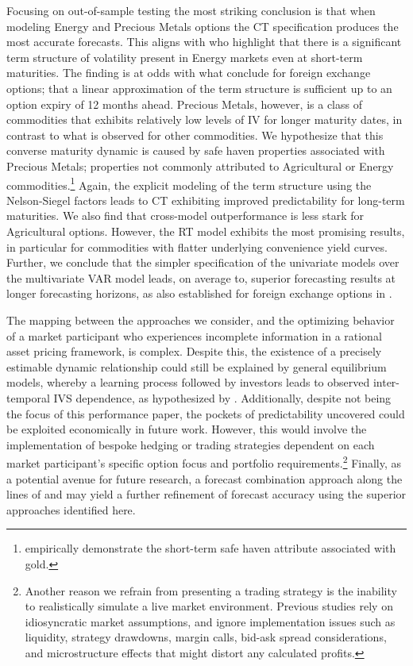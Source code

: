 \documentclass[12pt,a4paper]{article}
\begin{document}
Focusing on out-of-sample testing the most striking conclusion is that when modeling Energy and Precious Metals options the CT specification produces the most accurate forecasts. This aligns with \cite{doran2008computing} who highlight that there is a significant term structure of volatility present in Energy markets even at short-term maturities. The finding is at odds with what \cite{chalamandaris2011important} conclude for foreign exchange options; that a linear approximation of the term structure is sufficient up to an option expiry of 12 months ahead. Precious Metals, however, is a class of commodities that exhibits relatively low levels of IV for longer maturity dates, in contrast to what is observed for other commodities. We hypothesize that this converse maturity dynamic is caused by safe haven properties associated with Precious Metals; properties not commonly attributed to Agricultural or Energy commodities.\footnote{\cite{baur2010gold} empirically demonstrate the short-term safe haven attribute associated with gold.} Again, the explicit modeling of the term structure using the Nelson-Siegel factors leads to CT exhibiting improved predictability for long-term maturities. We also find that cross-model outperformance is less stark for Agricultural options. However, the RT model exhibits the most promising results, in particular for commodities with flatter underlying convenience yield curves. Further, we conclude that the simpler specification of the univariate models over the multivariate VAR model leads, on average to, superior forecasting results at longer forecasting horizons, as also established for foreign exchange options in \cite{Chalamandaris2014}.

The mapping between the approaches we consider, and the optimizing behavior of a market participant who experiences incomplete information in a rational asset pricing framework, is complex. Despite this, the existence of a precisely estimable dynamic relationship could still be explained by general equilibrium models, whereby a learning process followed by investors leads to observed inter-temporal IVS dependence, as hypothesized by \cite{bernales2015learning}. Additionally, despite not being the focus of this performance paper, the pockets of predictability uncovered could be exploited economically in future work. However, this would involve the implementation of bespoke hedging or trading strategies dependent on each market participant's specific option focus and portfolio requirements.\footnote{Another reason we refrain from presenting a trading strategy is the inability to realistically simulate a live market environment. Previous studies rely on idiosyncratic market assumptions, and ignore implementation issues such as liquidity, strategy drawdowns, margin calls, bid-ask spread considerations, and microstructure effects that might distort any calculated profits.} Finally, as a potential avenue for future research, a forecast combination approach along the lines of \cite{BG69} and \cite{gogolin2016does} may yield a further refinement of forecast accuracy using the superior approaches identified here.
\end{document}
